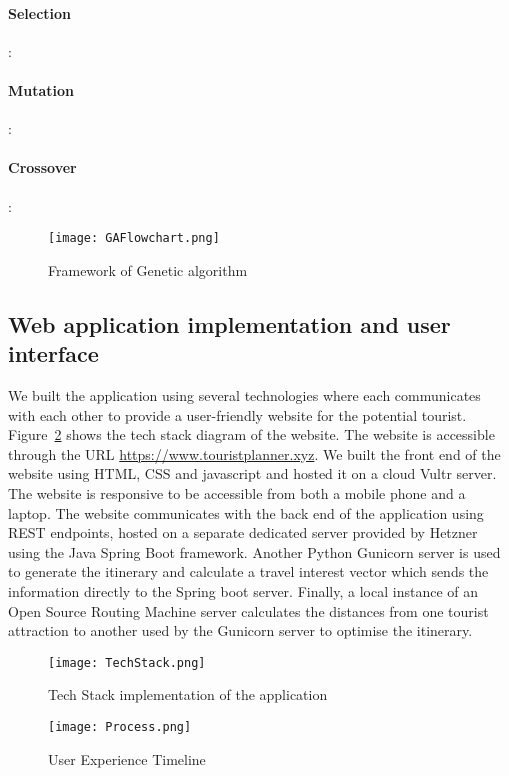\paragraph{Selection}:

\paragraph{Mutation}:

\paragraph{Crossover}:

\begin{figure}[h]
\centering
\texttt{[image: GAFlowchart.png]}
\caption{Framework of Genetic algorithm}
\label{FlowChart}
\end{figure}


\subsection{Web application implementation and user
interface}

We built the application using several technologies
where each communicates with each other to provide a
user-friendly website for the potential tourist.
Figure~\ref{TechStack} shows the tech stack diagram of the website.
The website is accessible through the URL
\url{https://www.touristplanner.xyz}. We built the front end of the website using HTML, CSS and javascript and hosted it
on a cloud Vultr server. The website is 
responsive to be accessible from both a
mobile phone and a laptop. The website communicates
with the back end of the application using REST
endpoints, hosted on a separate dedicated server
provided by Hetzner using the Java Spring Boot
framework.  Another Python Gunicorn server is used to
generate the itinerary and calculate a travel interest
vector which sends the information directly to the
Spring boot server. Finally, a local instance of an
Open Source Routing Machine server calculates the
distances from one tourist attraction to another used
by the Gunicorn server to optimise the itinerary. 

\begin{figure}[h]
\centering
\texttt{[image: TechStack.png]}
\caption{Tech Stack implementation of the application} \label{TechStack}
\end{figure}

\begin{figure}[h]
\centering
\texttt{[image: Process.png]}
\caption{User Experience Timeline}
\label{Timeline}
\end{figure}

